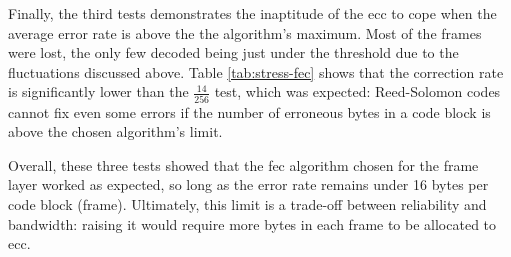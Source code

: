 Finally, the third tests demonstrates the inaptitude of the \acrshort{ecc}
to cope when the average error rate is above the the algorithm's maximum. Most
of the frames were lost, the only few decoded being just under the threshold
due to the fluctuations discussed above. Table \ref{tab:stress-fec} shows that
the correction rate is significantly lower than the $\frac{14}{256}$ test, which
was expected: Reed-Solomon codes cannot fix even some errors if the number of
erroneous bytes in a code block is above the chosen algorithm's limit.

Overall, these three tests showed that the \acrshort{fec} algorithm chosen for
the frame layer worked as expected, so long as the error rate remains under
16 bytes per code block (frame). Ultimately, this limit is a trade-off between
reliability and bandwidth: raising it would require more bytes in each frame
to be allocated to \acrlong{ecc}.
